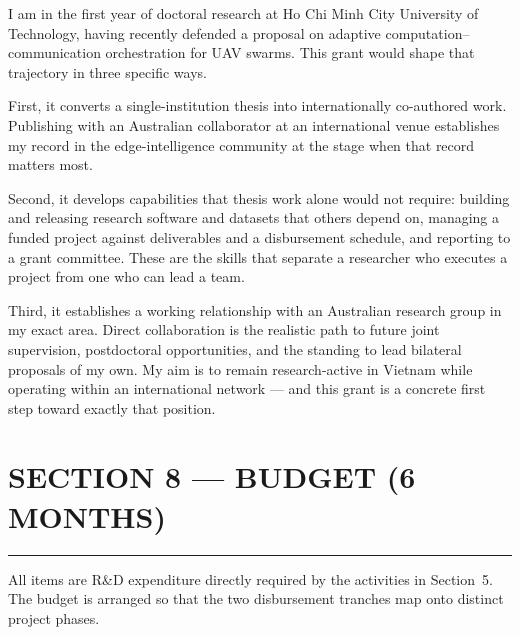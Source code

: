 \documentclass[11pt,a4paper]{article}
\begin{document}
I am in the first year of doctoral research at Ho Chi Minh City University of Technology, having recently defended a proposal on adaptive computation--communication orchestration for UAV swarms. This grant would shape that trajectory in three specific ways.

First, it converts a single-institution thesis into internationally co-authored work. Publishing with an Australian collaborator at an international venue establishes my record in the edge-intelligence community at the stage when that record matters most.

Second, it develops capabilities that thesis work alone would not require: building and releasing research software and datasets that others depend on, managing a funded project against deliverables and a disbursement schedule, and reporting to a grant committee. These are the skills that separate a researcher who executes a project from one who can lead a team.

Third, it establishes a working relationship with an Australian research group in my exact area. Direct collaboration is the realistic path to future joint supervision, postdoctoral opportunities, and the standing to lead bilateral proposals of my own. My aim is to remain research-active in Vietnam while operating within an international network --- and this grant is a concrete first step toward exactly that position.

\clearpage
\section*{\color{avblue}SECTION 8 --- BUDGET (6 MONTHS)}
\vspace{-4pt}\noindent\rule{\textwidth}{0.4pt}
\setcounter{section}{0}

\vspace{4pt}
\noindent All items are R\&D expenditure directly required by the activities in Section~5. The budget is arranged so that the two disbursement tranches map onto distinct project phases.
\end{document}
